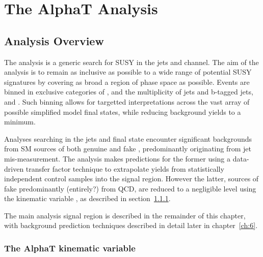 \chapter{The AlphaT Analysis}
\label{ch:5}

\ifpdf
    \graphicspath{{Chapter5/Figs/Raster/}{Chapter5/Figs/PDF/}{Chapter5/Figs/}}
\else
    \graphicspath{{Chapter5/Figs/Vector/}{Chapter5/Figs/}}
\fi


\section{Analysis Overview}  %
\label{sec:selection_analysis_overview}

The \alphat analysis is a generic search for SUSY in the jets and 
\met channel. The aim of the analysis is to remain as inclusive as possible to a
wide range of potential SUSY signatures by covering as broad a region of phase 
space as possible. Events are binned in exclusive categories of \HT, 
and the multiplicity of jets and b-tagged jets,  
\nj and \nb. Such binning allows for targetted interpretations across
the vast array of
possible simplified model final states, while reducing background yields to a 
minimum.

Analyses searching in the jets and \met final state encounter significant 
backgrounds from SM sources of both genuine  
and fake \met, predominantly originating from jet mis-measurement. The \alphat 
analysis makes predictions for the former using a data-driven transfer factor 
technique to extrapolate yields from statistically independent control samples 
into the signal region. However the latter, sources of fake \met predominantly 
(entirely?) from QCD, are reduced to a negligible level using the kinematic 
variable \alphat, as described in section~\ref{sec:alphat}.

The main analysis signal region is described in the remainder of this chapter,
with background prediction techniques described in detail later in
chapter~\ref{ch:6}.


\subsection{The AlphaT kinematic variable}
\label{sec:alphat}

